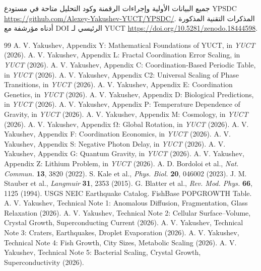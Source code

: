 \documentclass[11pt,a4paper]{article}
\begin{document}
	جميع البيانات الأولية وإجراءات الرقمنة وكود التحليل متاحة في مستودع YPSDC \url{https://github.com/Alexey-Yakushev-YUCT/YPSDC/}. المذكرات التقنية المذكورة أدناه مؤرشفة مع DOI الرئيسي لـ YUCT \url{https://doi.org/10.5281/zenodo.18444598}.
	
	\begin{thebibliography}{99}
		 A. V. Yakushev, Appendix Y: Mathematical Foundations of YUCT, in \emph{YUCT} (2026).
		 A. V. Yakushev, Appendix L: Fractal Coordination Error Scaling, in \emph{YUCT} (2026).
		 A. V. Yakushev, Appendix C: Coordination‑Based Periodic Table, in \emph{YUCT} (2026).
		 A. V. Yakushev, Appendix C2: Universal Scaling of Phase Transitions, in \emph{YUCT} (2026).
		 A. V. Yakushev, Appendix E: Coordination Genetics, in \emph{YUCT} (2026).
		 A. V. Yakushev, Appendix D: Biological Predictions, in \emph{YUCT} (2026).
		 A. V. Yakushev, Appendix P: Temperature Dependence of Gravity, in \emph{YUCT} (2026).
		 A. V. Yakushev, Appendix M: Cosmology, in \emph{YUCT} (2026).
		 A. V. Yakushev, Appendix Ω: Global Rotation, in \emph{YUCT} (2026).
		 A. V. Yakushev, Appendix F: Coordination Economics, in \emph{YUCT} (2026).
		 A. V. Yakushev, Appendix S: Negative Photon Delay, in \emph{YUCT} (2026).
		 A. V. Yakushev, Appendix G: Quantum Gravity, in \emph{YUCT} (2026).
		 A. V. Yakushev, Appendix Z: Lithium Problem, in \emph{YUCT} (2026).
		 A. D. Bordoloi et al., \emph{Nat. Commun.} \textbf{13}, 3820 (2022).
		 S. Kale et al., \emph{Phys. Biol.} \textbf{20}, 046002 (2023).
		 J. M. Stauber et al., \emph{Langmuir} \textbf{31}, 2353 (2015).
		 G. Blatter et al., \emph{Rev. Mod. Phys.} \textbf{66}, 1125 (1994).
		 USGS NEIC Earthquake Catalog.
		 FishBase POPGROWTH Table.
		 A. V. Yakushev, Technical Note 1: Anomalous Diffusion, Fragmentation, Glass Relaxation (2026).
		 A. V. Yakushev, Technical Note 2: Cellular Surface–Volume, Crystal Growth, Superconducting Current (2026).
		 A. V. Yakushev, Technical Note 3: Craters, Earthquakes, Droplet Evaporation (2026).
		 A. V. Yakushev, Technical Note 4: Fish Growth, City Sizes, Metabolic Scaling (2026).
		 A. V. Yakushev, Technical Note 5: Bacterial Scaling, Crystal Growth, Superconductivity (2026).
	\end{thebibliography}
	
\end{document}
